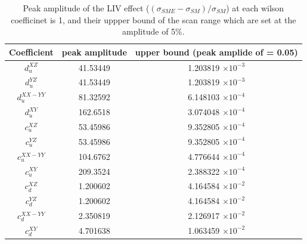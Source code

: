 \begin{table}
\centering 
\begin{tabular}{c | c c} %
Coefficient & peak amplitude & upper bound (peak amplide of  = 0.05)  \\
\hline

 $d_u^{XZ}    $ & 41.53449  & 1.203819 $ \times 10^{-3}$ \\
 $d_u^{YZ}    $ & 41.53449  & 1.203819 $ \times 10^{-3}$ \\
 $d_u^{XX-YY} $ & 81.32592  & 6.148103 $ \times 10^{-4}$ \\
 $d_u^{XY}    $ & 162.6518  & 3.074048 $ \times 10^{-4}$ \\
 $c_u^{XZ}    $ & 53.45986  & 9.352805 $ \times 10^{-4}$ \\
 $c_u^{YZ}    $ & 53.45986  & 9.352805 $ \times 10^{-4}$ \\
 $c_u^{XX-YY} $ & 104.6762  & 4.776644 $ \times 10^{-4}$ \\
 $c_u^{XY}    $ & 209.3524  & 2.388322 $ \times 10^{-4}$ \\
 $c_d^{XZ}    $ & 1.200602  & 4.164584 $ \times 10^{-2}$ \\
 $c_d^{YZ}    $ & 1.200602  & 4.164584 $ \times 10^{-2}$ \\
 $c_d^{XX-YY} $ & 2.350819  & 2.126917 $ \times 10^{-2}$ \\
 $c_d^{XY}    $ & 4.701638  & 1.063459 $ \times 10^{-2}$  \\
\end{tabular}
\caption{\label{tab:scan_range} Peak amplitude of the LIV effect ($(\sigma_{SME}-\sigma_{SM})/\sigma_{SM}$) at each wilson coefficinet is 1, 
and their uppper bound of the scan range which are set at the amplitude of 5\%.}
\end{table}
  
  
  
  
  
  
  
  
  
  
  

